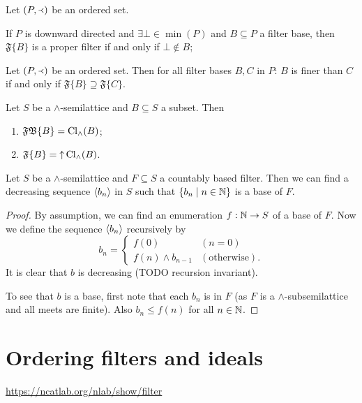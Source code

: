 \begin{lemma}
Let $\sSet{P,\Yleft}$ be an ordered set.

If $P$ is downward directed and $\exists \bot \in \min(P)$ and $B \subseteq P$ a filter base, then $\mathfrak{F}\{B\}$ is a proper filter \textup{if and only if} $\bot \notin B$; 
\end{lemma}

\begin{proposition}
Let $\sSet{P,\Yleft}$ be an ordered set. Then for all filter bases $B,C$ in $P$: $B$ is finer than $C$ \textup{if and only if} $\mathfrak{F}\{B\} \supseteq \mathfrak{F}\{C\}$.
\end{proposition}

\begin{proposition} \label{filterGenerationSemilattice}
Let $S$ be a $\wedge$-semilattice and $B\subseteq S$ a subset. Then
\begin{enumerate}
\item $\mathfrak{FB}\{B\} = \operatorname{Cl}_\wedge(B)$;
\item $\mathfrak{F}\{B\} = \operatorname{\uparrow}\operatorname{Cl}_\wedge(B)$.
\end{enumerate}
\end{proposition}

\begin{lemma} \label{decreasingCountableBaseFilter}
Let $S$ be a $\wedge$-semilattice and $F\subseteq S$ a countably based filter. Then we can find a decreasing sequence $\left\langle b_n \right\rangle$ in $S$ such that $\setbuilder{b_n}{n\in \N}$ is a base of $F$.
\end{lemma}
\begin{proof}
By assumption, we can find an enumeration $f: \mathbb{N}\to S$ of a base of $F$. Now we define the sequence $\left\langle b_n \right\rangle$ recursively by
\[ b_n = \begin{cases}
f(0) & (n = 0) \\
f(n) \wedge b_{n-1} & (\text{otherwise}).
\end{cases} \]
It is clear that $b$ is decreasing (TODO recursion invariant).

To see that $b$ is a base, first note that each $b_n$ is in $F$ (as $F$ is a $\wedge$-subsemilattice and all meets are finite). Also $b_n \leq f(n)$ for all $n\in\mathbb{N}$.
\end{proof}

\section{Ordering filters and ideals}
\url{https://ncatlab.org/nlab/show/filter}

